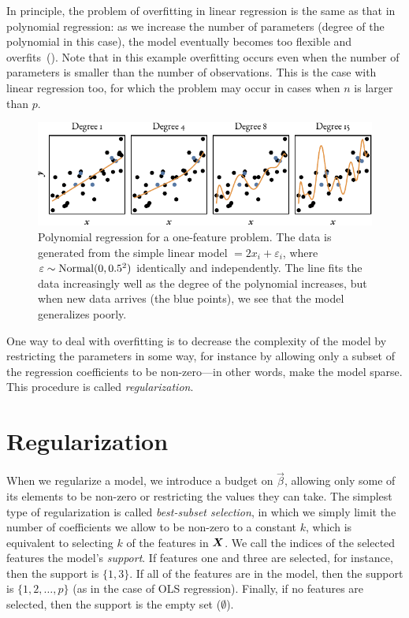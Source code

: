 In principle, the problem of overfitting in linear regression is the same as that in polynomial regression: as we increase the number of parameters (degree of the polynomial in this case), the model eventually becomes too flexible and overfits~().
Note that in this example overfitting occurs even when the number of parameters is smaller than the number of observations. This is the case with linear regression too, for which the problem  may occur in cases when \(n\) is larger than \(p\).

\begin{figure}
  \centering
  \includegraphics[]{figures/polyfit.pdf}
  \caption{%
    Polynomial regression for a one-feature problem.
    The data is generated from the simple linear model \( = 2x_i + \varepsilon_i\),
    where \(\varepsilon \sim \operatorname{Normal}(0, 0.5^2)\) identically and independently.
    The line fits the data increasingly well as the degree of the polynomial increases, but when new data arrives (the blue points), we see that the model generalizes poorly.
  }
  \label{fig:polyfit}
\end{figure}

One way to deal with overfitting is to decrease the complexity of the model by restricting the parameters in some way, for instance by allowing only a subset of the regression coefficients to be non-zero---in other words, make the model sparse. This procedure is called \emph{regularization}.

\section{Regularization}

When we regularize a model, we introduce a budget on \(\vec{\beta}\), allowing only some of its elements to be non-zero or restricting the values they can take.
The simplest type of regularization is called \emph{best-subset selection}, in which we simply limit the number of coefficients we allow to be non-zero to a constant \(k\), which is equivalent to selecting \(k\) of the features in \(\boldsymbol{X}\). We call the indices of the selected features the model's \emph{support}. If features one and three are selected, for instance, then the support is \(\{1,3\}\). If all of the features are in the model, then the support is \(\{1,2,\dots,p\}\) (as in the case of OLS regression). Finally, if no features are selected, then the support is the empty set (\(\emptyset\)).

